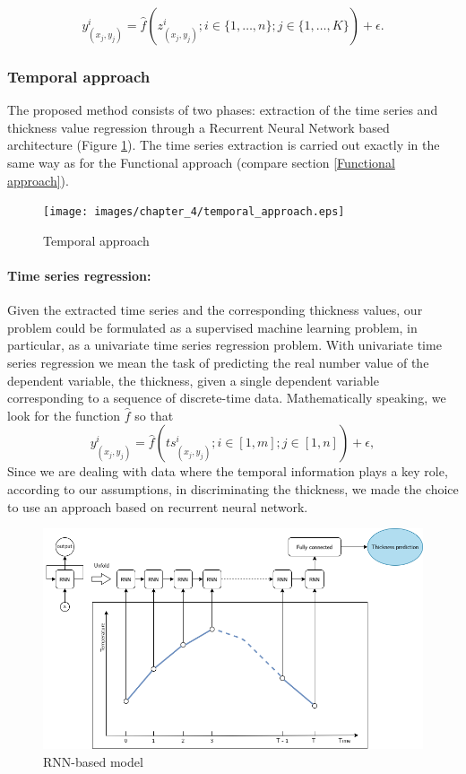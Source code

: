 \begin{equation}
    y^{i}_{(x_j,y_j)} = \hat{f}(z^{i}_{(x_j, y_j)}; i \in \{1, \ldots,n\}; j \in \{1, \ldots,K\}) + \epsilon.
\end{equation} 

\subsubsection{Temporal approach}

The proposed method consists of two phases: extraction of the time series and thickness value regression through a Recurrent Neural Network based architecture (Figure \ref{fig:temporal_approach}). The time series extraction is carried out exactly in the same way as for the Functional approach (compare section \ref{Functional approach}).  

\begin{figure}
\centering
\texttt{[image: images/chapter\_4/temporal\_approach.eps]}
\caption{Temporal approach}
\label{fig:temporal_approach}
\end{figure}

\paragraph{Time series regression:}

Given the extracted time series and the corresponding thickness values, our problem could be formulated as a supervised machine learning problem, in particular, as a univariate time series regression problem. With univariate time series regression we mean the task of predicting the real number value of the dependent variable, the thickness, given a single dependent variable corresponding to a sequence of discrete-time data. 
Mathematically speaking, we look for the function $\hat{f}$ so that
\begin{equation}
    y^{i}_{(x_j,y_j)} = \hat{f}(ts^{i}_{(x_j, y_j)}; i \in [1, m]; j \in [1, n]) + \epsilon,
\end{equation} 
Since we are dealing with data where the temporal information plays a key role, according to our assumptions, in discriminating the thickness, we made the choice to use an approach based on recurrent neural network. 

\begin{figure}
\centering
\includegraphics[scale=0.45]{images/chapter_4/rnn_model.png}
\caption{RNN-based model}
\label{fig:rnn_model}
\end{figure}

